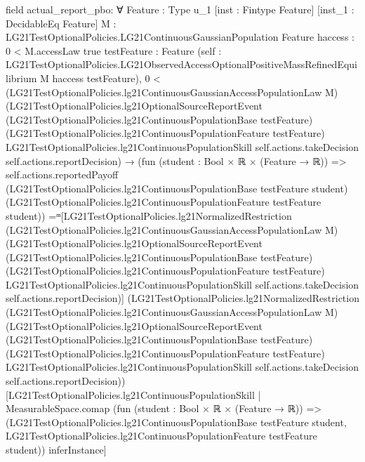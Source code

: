 \documentclass[10pt]{article}
\begin{document}
\begin{ReviewVerbatim}
field actual_report_pbo:
∀ {Feature : Type u_1} [inst : Fintype Feature] [inst_1 : DecidableEq Feature]
  {M : LG21TestOptionalPolicies.LG21ContinuousGaussianPopulation Feature} {haccess : 0 < M.accessLaw {true}}
  {testFeature : Feature}
  (self : LG21TestOptionalPolicies.LG21ObservedAccessOptionalPositiveMassRefinedEquilibrium M haccess testFeature),
  0 <
      (LG21TestOptionalPolicies.lg21ContinuousGaussianAccessPopulationLaw M)
        (LG21TestOptionalPolicies.lg21OptionalSourceReportEvent
          (LG21TestOptionalPolicies.lg21ContinuousPopulationBase testFeature)
          (LG21TestOptionalPolicies.lg21ContinuousPopulationFeature testFeature)
          LG21TestOptionalPolicies.lg21ContinuousPopulationSkill self.actions.takeDecision
          self.actions.reportDecision) →
    (fun (student : Bool × ℝ × (Feature → ℝ)) =>
        self.actions.reportedPayoff (LG21TestOptionalPolicies.lg21ContinuousPopulationBase testFeature student)
          (LG21TestOptionalPolicies.lg21ContinuousPopulationFeature testFeature
            student)) =ᵐ[LG21TestOptionalPolicies.lg21NormalizedRestriction
        (LG21TestOptionalPolicies.lg21ContinuousGaussianAccessPopulationLaw M)
        (LG21TestOptionalPolicies.lg21OptionalSourceReportEvent
          (LG21TestOptionalPolicies.lg21ContinuousPopulationBase testFeature)
          (LG21TestOptionalPolicies.lg21ContinuousPopulationFeature testFeature)
          LG21TestOptionalPolicies.lg21ContinuousPopulationSkill self.actions.takeDecision self.actions.reportDecision)]
      (LG21TestOptionalPolicies.lg21NormalizedRestriction
          (LG21TestOptionalPolicies.lg21ContinuousGaussianAccessPopulationLaw M)
          (LG21TestOptionalPolicies.lg21OptionalSourceReportEvent
            (LG21TestOptionalPolicies.lg21ContinuousPopulationBase testFeature)
            (LG21TestOptionalPolicies.lg21ContinuousPopulationFeature testFeature)
            LG21TestOptionalPolicies.lg21ContinuousPopulationSkill self.actions.takeDecision
            self.actions.reportDecision))[LG21TestOptionalPolicies.lg21ContinuousPopulationSkill |
        MeasurableSpace.comap
          (fun (student : Bool × ℝ × (Feature → ℝ)) =>
            (LG21TestOptionalPolicies.lg21ContinuousPopulationBase testFeature student,
              LG21TestOptionalPolicies.lg21ContinuousPopulationFeature testFeature student))
          inferInstance]


\end{ReviewVerbatim}
\end{document}
